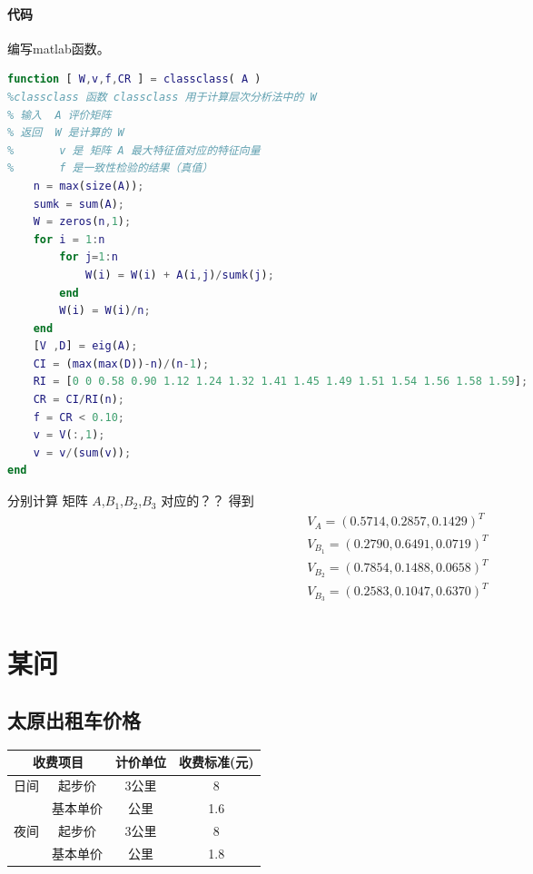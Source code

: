 \documentclass{ctexart}
\begin{document}
    \paragraph{代码}
    \label{code:cc}
    编写matlab函数。
    \begin{lstlisting}[language=matlab]
function [ W,v,f,CR ] = classclass( A )
%classclass 函数 classclass 用于计算层次分析法中的 W
% 输入  A 评价矩阵
% 返回  W 是计算的 W
%       v 是 矩阵 A 最大特征值对应的特征向量
%       f 是一致性检验的结果（真值）
    n = max(size(A));
    sumk = sum(A);
    W = zeros(n,1);
    for i = 1:n
        for j=1:n
            W(i) = W(i) + A(i,j)/sumk(j);
        end
        W(i) = W(i)/n;
    end
    [V ,D] = eig(A);
    CI = (max(max(D))-n)/(n-1);
    RI = [0 0 0.58 0.90 1.12 1.24 1.32 1.41 1.45 1.49 1.51 1.54 1.56 1.58 1.59];
    CR = CI/RI(n);
    f = CR < 0.10;
    v = V(:,1);
    v = v/(sum(v));
end
    \end{lstlisting}
    分别计算 矩阵 $A$,$B_1$,$B_2$,$B_3$ 对应的？？
    得到
    \begin{align*}
    V_A = (0.5714,0.2857,0.1429)^T \\
    V_{B_1} = (0.2790,0.6491,0.0719)^T \\
    V_{B_2} = (0.7854,0.1488,0.0658)^T \\
    V_{B_3} = (0.2583,0.1047,0.6370)^T\\
    \end{align*}
    
    \section{某问}
    \label{sec:qq}
    \subsection{太原出租车价格}
    \label{ssec:taxipr:ty}
    \begin{tabular}{|c|c|c|c|}
        \hline \multicolumn{2}{|c|}{收费项目} & 计价单位 & 收费标准(元)\\ 
        \hline 日间 & 起步价 & 3公里 & 8 \\ 
   \cline{2-4}  & 基本单价 & 公里 & 1.6 \\ 
        \hline 夜间 & 起步价 & 3公里 & 8 \\ 
   \cline{2-4}  & 基本单价 & 公里 & 1.8 \\ 
        \hline
    \end{tabular}
\end{document}
